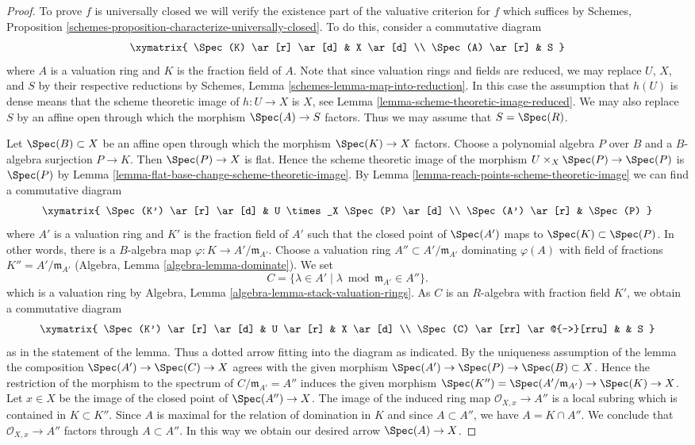 \begin{proof}
To prove $f$ is universally closed we will verify the existence part of the
valuative criterion for $f$ which suffices by
Schemes, Proposition \ref{schemes-proposition-characterize-universally-closed}.
To do this, consider a commutative diagram
$$
\xymatrix{
\Spec(K) \ar[r] \ar[d] & X \ar[d] \\
\Spec(A) \ar[r] & S
}
$$
where $A$ is a valuation ring and $K$ is the fraction field of $A$.
Note that since valuation rings and fields are reduced, we may
replace $U$, $X$, and $S$ by their respective reductions
by Schemes, Lemma \ref{schemes-lemma-map-into-reduction}.
In this case the assumption that $h(U)$ is dense means that
the scheme theoretic image of $h : U \to X$ is $X$, see
Lemma \ref{lemma-scheme-theoretic-image-reduced}.
We may also replace $S$ by an affine open through which
the morphism $\Spec(A) \to S$ factors. Thus we may
assume that $S = \Spec(R)$.

\medskip\noindent
Let $\Spec(B) \subset X$ be an affine open through which
the morphism $\Spec(K) \to X$ factors. Choose a polynomial
algebra $P$ over $B$ and a $B$-algebra surjection $P \to K$.
Then $\Spec(P) \to X$ is flat. Hence the scheme theoretic image
of the morphism $U \times_X \Spec(P) \to \Spec(P)$ is $\Spec(P)$ by
Lemma \ref{lemma-flat-base-change-scheme-theoretic-image}.
By Lemma \ref{lemma-reach-points-scheme-theoretic-image}
we can find a commutative diagram
$$
\xymatrix{
\Spec(K') \ar[r] \ar[d] & U \times_X \Spec(P) \ar[d] \\
\Spec(A') \ar[r] & \Spec(P)
}
$$
where $A'$ is a valuation ring and $K'$ is the fraction field of $A'$
such that the closed point of $\Spec(A')$ maps to $\Spec(K) \subset \Spec(P)$.
In other words, there is a $B$-algebra map
$\varphi : K \to A'/\mathfrak m_{A'}$. Choose a valuation ring
$A'' \subset A'/\mathfrak m_{A'}$ dominating $\varphi(A)$ with
field of fractions $K'' = A'/\mathfrak m_{A'}$
(Algebra, Lemma \ref{algebra-lemma-dominate}). We set
$$
C = \{\lambda \in A' \mid \lambda \bmod \mathfrak m_{A'} \in A''\}.
$$
which is a valuation ring by
Algebra, Lemma \ref{algebra-lemma-stack-valuation-rings}.
As $C$ is an $R$-algebra with fraction field $K'$, we obtain a
commutative diagram
$$
\xymatrix{
\Spec(K') \ar[r] \ar[d] & U \ar[r] & X \ar[d] \\
\Spec(C) \ar[rr] \ar@{-->}[rru] & & S
}
$$
as in the statement of the lemma. Thus a dotted arrow fitting into
the diagram as indicated. By the uniqueness assumption of the lemma
the composition $\Spec(A') \to \Spec(C) \to X$ agrees with the
given morphism $\Spec(A') \to \Spec(P) \to \Spec(B) \subset X$.
Hence the restriction of the morphism to the spectrum of
$C/\mathfrak m_{A'} = A''$ induces the given morphism
$\Spec(K'') = \Spec(A'/\mathfrak m_{A'}) \to \Spec(K) \to X$.
Let $x \in X$ be the image of the closed point of $\Spec(A'') \to X$.
The image of the induced ring map $\mathcal{O}_{X, x} \to A''$
is a local subring which is contained in $K \subset K''$.
Since $A$ is maximal for the relation of domination in $K$
and since $A \subset A''$, we have $A = K \cap A''$. We conclude
that $\mathcal{O}_{X, x} \to A''$ factors through $A \subset A''$.
In this way we obtain our desired arrow $\Spec(A) \to X$.


\end{proof}
